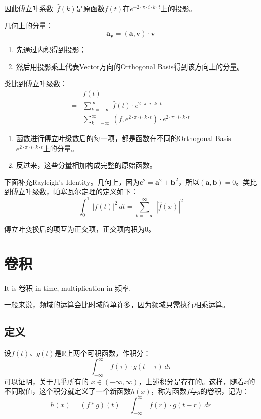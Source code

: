 因此傅立叶系数\ $\hat{f}(k)$是原函数$f(t)$在$e^{-2\cdot \pi\cdot i\cdot k\cdot t}$上的投影。

几何上的分量：
$$
	\mathbf{a}_{\mathbf{v}}=(\mathbf{a},\mathbf{v})\cdot \mathbf{v}
$$
\begin{enumerate}
	\item 先通过内积得到投影；
	\item 然后用投影乘上代表Vector方向的Orthogonal Basis得到该方向上的分量。
\end{enumerate}

类比到傅立叶级数：
\begin{align*}
	  & f(t)                                                                                                             \\
	= & \sum\limits_{k=-\infty}^\infty \ \hat{f}(t)\cdot e^{2\cdot \pi\cdot i\cdot k\cdot t}                             \\
	= & \sum\limits_{k=-\infty}^\infty\ (f,e^{2\cdot \pi\cdot i\cdot k\cdot t})\cdot e^{2\cdot \pi\cdot i\cdot k\cdot t}
\end{align*}

\begin{enumerate}
	\item 函数进行傅立叶级数后的每一项，都是函数在不同的Orthogonal Basis$e^{2\cdot \pi\cdot i\cdot k\cdot t}$上的分量。
	\item 反过来，这些分量相加构成完整的原始函数。
\end{enumerate}

下面补充Rayleigh's Identity。几何上，因为$\mathbf{c}^2=\mathbf{a}^2+\mathbf{b}^2$，所以$(\mathbf{a},\mathbf{b})=0$。类比到傅立叶级数，帕塞瓦尔定理的定义如下：
$$
	\int_0^1\ |f(t)|^2\ dt=\sum\limits_{k=-\infty}^{\infty}\ |\hat{f}(x)|^2
$$

傅立叶变换后的项互为正交项，正交项内积为$0$。
\section{卷积}
It is 卷积 in time, multiplication in 频率.

一般来说，频域的运算会比时域简单许多，因为频域只需执行相乘运算。
\subsection{定义}
设$f(t)$、$g(t)$是$\mathbb{R}$上两个可积函数，作积分：
$$
	\int_{-\infty}^\infty\ f(\tau)\cdot g(t-\tau)\ d\tau
$$
可以证明，关于几乎所有的 $x\in (-\infty ,\infty )$，上述积分是存在的。这样，随着$x$的不同取值，这个积分就定义了一个新函数$h(x)$，称为函数$f$与$g$的卷积，记为：
$$
	h(x)=(f*g)(t)=\int_{-\infty}^{\infty}\ f(r)\cdot g(t-r)\ dr
$$
